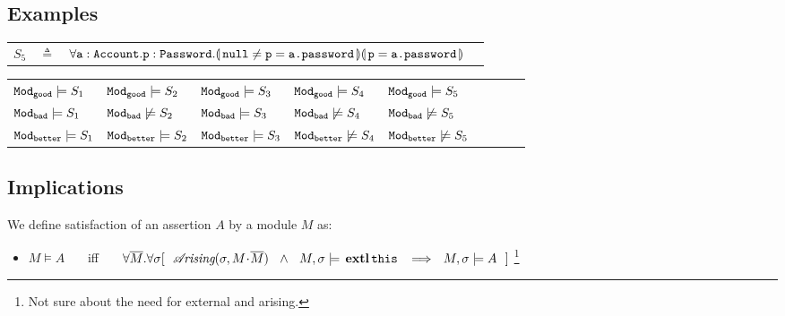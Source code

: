 {{\subsection{\SpecLang Examples}
\noindent
{}

\begin{tabular}{lcll}
$S_5$ & $\triangleq$   & ${\forall {{\texttt{a}}:{\texttt{Account}}.{\texttt{p}}:{\texttt{Password}}}.{\llparenthesis}\, {\texttt{null}}\neq {\texttt{p}}={\texttt{a.password}} \,{\rrparenthesis}{\llparenthesis}\, {\texttt{p}}={\texttt{a.password}} \,{\rrparenthesis} }$
 \end{tabular}


\noindent
{}

\begin{tabular}{lllllllll}
${\texttt{Mod}}_{{\texttt{good}}}  \models S_1$  &   ${\texttt{Mod}}_{{\texttt{good}}}  \models S_2$ &  ${\texttt{Mod}}_{{\texttt{good}}} \models S_3$ &   ${\texttt{Mod}}_{{\texttt{good}}} \models S_4$    & ${\texttt{Mod}}_{{\texttt{good}}} \models S_5$\\
 ${\texttt{Mod}}_{{\texttt{bad}}} \models S_1$  &   ${\texttt{Mod}}_{{\texttt{bad}}} \not\models S_2$   &  ${\texttt{Mod}}_{{\texttt{bad}}}  \models S_3$   &  ${\texttt{Mod}}_{{\texttt{bad}}}  \not\models S_4$   & ${\texttt{Mod}}_{{\texttt{bad}}} \not\models S_5$ \\
 ${\texttt{Mod}}_{{\texttt{better}}}  \models S_1$    & ${\texttt{Mod}}_{{\texttt{better}}} \models S_2$ &   ${\texttt{Mod}}_{{\texttt{better}}} \models S_3$    &${\texttt{Mod}}_{{\texttt{better}}} \not\models S_4$   & ${\texttt{Mod}}_{{\texttt{better}}} \not\models S_5$ 
\end{tabular}
 
\subsection{\SpecLang Implications}

\begin{definition} 
\label{def:assertion-inference-semantics}
We define satisfaction of an assertion $A$ by a  module $M$ as:
\begin{itemize}
\item
{
$M \vDash A$   \ \ \ iff \ \ \  $\forall \overline{M}. \forall \sigma
[\ \    \arising{\sigma}{M\madd\overline{M}}\   \  \wedge\ \  \satisfiesA {M}   {\sigma} {\external{\prg{this}}} 
\   \ \Longrightarrow \ \ \satisfiesA{M}{\sigma}{A}\ \ ]$
}\footnote{Not sure about the need for external and arising.}
\end{itemize}
\end{definition}

}}
